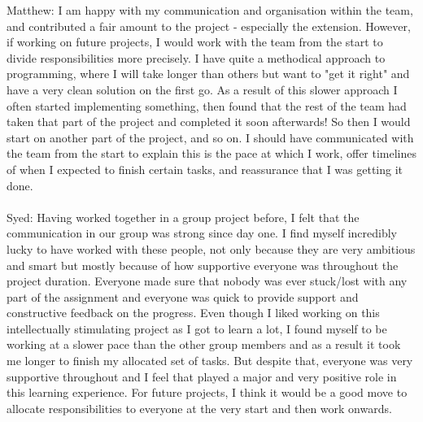 \documentclass{article}
\begin{document}
Matthew: I am happy with my communication and organisation within the team, and contributed a fair amount to the project - especially the extension. However, if working on future projects, I would work with the team from the start to divide responsibilities more precisely. I have quite a methodical approach to programming, where I will take longer than others but want to "get it right" and have a very clean solution on the first go. As a result of this slower approach I often started implementing something, then found that the rest of the team had taken that part of the project and completed it soon afterwards! So then I would start on another part of the project, and so on. I should have communicated with the team from the start to explain this is the pace at which I work, offer timelines of when I expected to finish certain tasks, and reassurance that I was getting it done.
\\\\
Syed: Having worked together in a group project before, I felt that the communication in our group was strong since day one. I find myself incredibly lucky to have worked with these people, not only because they are very ambitious and smart but mostly because of how supportive everyone was throughout the project duration. Everyone made sure that nobody was ever stuck/lost with any part of the assignment and everyone was quick to provide support and constructive feedback on the progress. Even though I liked working on this intellectually stimulating project as I got to learn a lot, I found myself to be working at a slower pace than the other group members and as a result it took me longer to finish my allocated set of tasks. But despite that, everyone was very supportive throughout and I feel that played a major and very positive role in this learning experience. For future projects, I think it would be a good move to allocate responsibilities to everyone at the very start and then work onwards.
\end{document}

